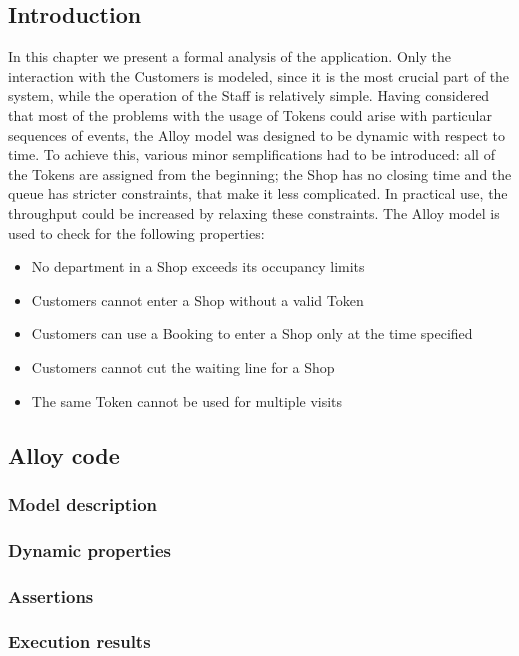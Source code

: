 \subsection{Introduction}
In this chapter we present a formal analysis of the application. Only the interaction with the Customers is modeled, since it is the most crucial part of the system, while the operation of the Staff is relatively simple. Having considered that most of the problems with the usage of Tokens could arise with particular sequences of events, the Alloy model was designed to be dynamic with respect to time. 
To achieve this, various minor semplifications had to be introduced: all of the Tokens are assigned from the beginning; the Shop has no closing time and the queue has stricter constraints, that make it less complicated. In practical use, the throughput could be increased by relaxing these constraints. 
The Alloy model is used to check for the following properties:
\begin{itemize}
    \item No department in a Shop exceeds its occupancy limits
    \item Customers cannot enter a Shop without a valid Token
    \item Customers can use a Booking to enter a Shop only at the time specified
    \item Customers cannot cut the waiting line for a Shop
    \item The same Token cannot be used for multiple visits
\end{itemize}
\subsection{Alloy code}
\subsubsection{Model description}

\subsubsection{Dynamic properties}

\subsubsection{Assertions}

\subsubsection{Execution results}
